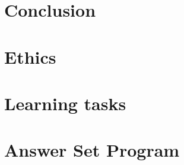 \documentclass[11pt,twoside]{report}
\theoremstyle{plain}
\theoremstyle{definition}
\begin{document}
\chapter{Conclusion}
\label{conclusion}


\newpage



\newpage
\appendix
\chapter{Ethics}



\newpage
\chapter{Learning tasks}
\label{chap:learning_tasks}


\newpage
\chapter{Answer Set Program}

\end{document}
